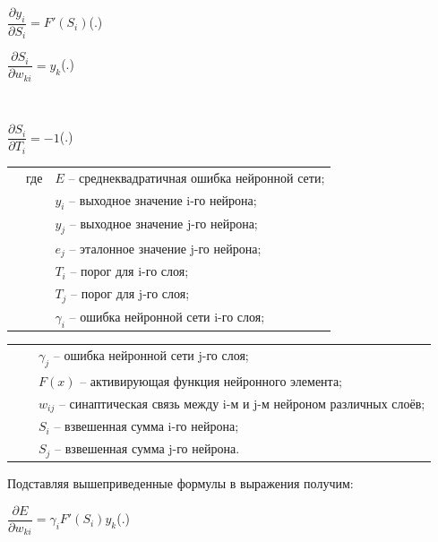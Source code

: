 {		\formulaspace \par \redline 
	$\dfrac{\partial y_i}{\partial S_i} =  F'(S_{i})$\hfill (\thechaptercntr .\theformulacntr) \redline
	\formulaspace \addtocounter{formulacntr}{1}
	
	\formulaspace \par \redline 
	$\dfrac{\partial S_i}{\partial w_{ki}} =  y_{k}$\hfill (\thechaptercntr .\theformulacntr) \redline
	\formulaspace \addtocounter{formulacntr}{1}\\
	
	\formulaspace \par \redline 
	$\dfrac{\partial S_i}{\partial T_{i}} = -1 $\hfill (\thechaptercntr .\theformulacntr) \redline
	\formulaspace \addtocounter{formulacntr}{1}
	
	\begin{tabular}{p{}p{}p{}}
		& где  & $E$ {--} среднеквадратичная ошибка нейронной сети; \\
		&      & $y_{i}$ {--} выходное значение i-го нейрона; \\
		&      & $y_{j}$ {--} выходное значение j-го нейрона; \\
		&      & $e_{j}$ {--} эталонное значение j-го нейрона; \\
		&      & $T_{i}$ {--} порог для i-го слоя; \\
		&      & $T_{j}$ {--} порог для j-го слоя; \\
		&      & $\gamma_{i}$ {--} ошибка нейронной сети i-го слоя; \\
	\end{tabular}
	
	\begin{tabular}{p{}p{}p{}}
		&      & $\gamma_{j}$ {--} ошибка нейронной сети j-го слоя; \\
		&      & $F(x)$ {--} активирующая функция нейронного элемента; \\
		&      & $w_{ij}$ {--} синаптическая связь между i-м и j-м нейроном различных слоёв; \\
		&      & $S_{i}$ {--} взвешенная сумма i-го нейрона; \\
		&      & $S_{j}$ {--} взвешенная сумма j-го нейрона. \\
	\end{tabular}
	
	\par \redline Подставляя вышеприведенные формулы в выражения получим:
	
	\formulaspace \par \redline 
	$\dfrac{\partial E}{\partial w_{ki}} =  \gamma_{i} F'(S_{i}) y_k$\hfill (\thechaptercntr .\theformulacntr) \redline
	\formulaspace \addtocounter{formulacntr}{1}
	
}
